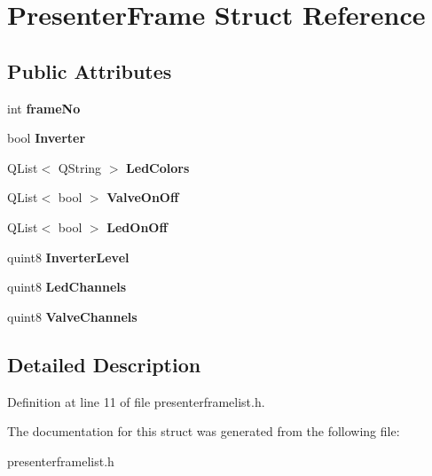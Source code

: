 \hypertarget{struct_presenter_frame}{}\section{Presenter\+Frame Struct Reference}
\label{struct_presenter_frame}
\subsection*{Public Attributes}
\begin{DoxyCompactItemize}
\item 
\mbox{\label{struct_presenter_frame_ab6e74c278ed47206a337946f4285e503}} 
int {\bfseries frame\+No}
\item 
\mbox{\label{struct_presenter_frame_a027768e83fa218a53c200ae2cdb818b0}} 
bool {\bfseries Inverter}
\item 
\mbox{\label{struct_presenter_frame_ae3b6ee796f8b81ac17b9c205b9bededb}} 
Q\+List$<$ Q\+String $>$ {\bfseries Led\+Colors}
\item 
\mbox{\label{struct_presenter_frame_aae729757acf82d19cef43d6fb393ebfb}} 
Q\+List$<$ bool $>$ {\bfseries Valve\+On\+Off}
\item 
\mbox{\label{struct_presenter_frame_ab16e28cf8de421804ea8206b87f638f7}} 
Q\+List$<$ bool $>$ {\bfseries Led\+On\+Off}
\item 
\mbox{\label{struct_presenter_frame_a003a4a04273751f60dd6039965df003b}} 
quint8 {\bfseries Inverter\+Level}
\item 
\mbox{\label{struct_presenter_frame_afd7452174aa516588265108b958f0310}} 
quint8 {\bfseries Led\+Channels}
\item 
\mbox{\label{struct_presenter_frame_abda45e10095e8fd132af2241960ceb84}} 
quint8 {\bfseries Valve\+Channels}
\end{DoxyCompactItemize}


\subsection{Detailed Description}


Definition at line 11 of file presenterframelist.\+h.



The documentation for this struct was generated from the following file\+:\begin{DoxyCompactItemize}
\item 
presenterframelist.\+h\end{DoxyCompactItemize}

